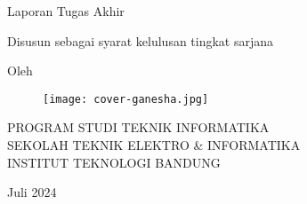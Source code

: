 \clearpage
\pagestyle{empty}

\begin{center}
	\smallskip
	
	\Large \bfseries \MakeUppercase{\thetitle}
	\vfill
	
	\Large Laporan Tugas Akhir
	\vfill
	
	\large Disusun sebagai syarat kelulusan tingkat sarjana
	\vfill
	
	\large Oleh
	
	\Large \theauthor
	
	\vfill
	\begin{figure}[ht]
		\centering
		\texttt{[image: cover-ganesha.jpg]}
	\end{figure}
	\vfill
	
	\large
	\uppercase{
		Program Studi Teknik Informatika \\
		Sekolah Teknik Elektro \& Informatika \\
		Institut Teknologi Bandung
	}
	
	Juli 2024
	
\end{center}

\clearpage
